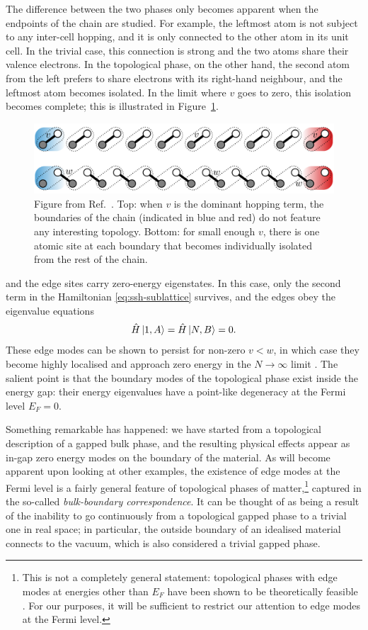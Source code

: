 The difference between the two phases only becomes apparent when the endpoints of the chain are studied. For example, the leftmost atom is not subject to any inter-cell hopping, and it is only connected to the other atom in its unit cell. In the trivial case, this connection is strong and the two atoms share their valence electrons. In the topological phase, on the other hand, the second atom from the left prefers to share electrons with its right-hand neighbour, and the leftmost atom becomes isolated. In the limit where $v$ goes to zero, this isolation becomes complete; this is illustrated in Figure~\ref{fig:SSH-boundaries}.
\begin{figure}[htb!]
	\centering
	\includegraphics[width=0.8\linewidth]{Images/SSH-boundaries}
	\caption{Figure from Ref.~\cite{Asboth_topo-course}. Top: when $v$ is the dominant hopping term, the boundaries of the chain (indicated in blue and red) do not feature any interesting topology. Bottom: for small enough $v$, there is one atomic site at each boundary that becomes individually isolated from the rest of the chain.}
	\label{fig:SSH-boundaries}
\end{figure}
and the edge sites carry zero-energy eigenstates. In this case, only the second term in the Hamiltonian \eqref{eq:ssh-sublattice} survives, and the edges obey the eigenvalue equations
\begin{align*}
	\hat{H}\ket{1,A} = \hat{H}\ket{N,B} = 0.
\end{align*}
These edge modes can be shown to persist for non-zero $v<w$, in which case they become highly localised and approach zero energy in the $N\to\infty$ limit \cite{Asboth_topo-course}. The salient point is that the boundary modes of the topological phase exist inside the energy gap: their energy eigenvalues have a point-like degeneracy at the Fermi level $E_F = 0$. 

Something remarkable has happened: we have started from a topological description of a gapped bulk phase, and the resulting physical effects appear as in-gap zero energy modes on the boundary of the material. As will become apparent upon looking at other examples, the existence of edge modes at the Fermi level is a fairly general feature of topological phases of matter,\footnote{
	This is not a completely general statement: topological phases with edge modes at energies other than $E_F$ have been shown to be theoretically feasible \cite{Freedman_gapped-edge}. For our purposes, it will be sufficient to restrict our attention to edge modes at the Fermi level.}
captured in the so-called \emph{bulk-boundary correspondence}. It can be thought of as being a result of the inability to go continuously from a topological gapped phase to a trivial one in real space; in particular, the outside boundary of an idealised material connects to the vacuum, which is also considered a trivial gapped phase.

